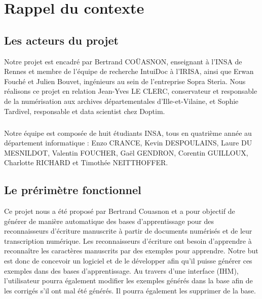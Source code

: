 
\chapter{Rappel du contexte}

\section{Les acteurs du projet}

Notre projet est encadré par Bertrand COÜASNON, enseignant à l’INSA de Rennes et membre de l’équipe de recherche IntuiDoc à l’IRISA, ainsi que Erwan Fouché et Julien Bouvet, ingénieurs au sein de l’entreprise Sopra Steria. Nous réalisons ce projet en relation Jean-Yves LE CLERC, conservateur et responsable de la numérisation  aux archives départementales d’Ille-et-Vilaine, et Sophie Tardivel, responsable et data scientist chez Doptim.

\paragraph{}

Notre équipe est composée de huit étudiants INSA, tous en quatrième année au département informatique : Enzo CRANCE, Kevin DESPOULAINS, Laure DU MESNILDOT, Valentin FOUCHER, Gaël GENDRON, Corentin GUILLOUX, Charlotte RICHARD et Timothée NEITTHOFFER.

\section{Le prérimètre fonctionnel}

Ce projet nous a été proposé par Bertrand Couasnon et a pour objectif de générer de manière automatique des bases d’apprentissage pour des reconnaisseurs d’écriture manuscrite à partir de documents numérisés et de leur transcription numérique. Les reconnaisseurs d’écriture ont besoin d’apprendre à reconnaître les caractères manuscrits par des exemples pour apprendre. Notre but est donc de concevoir un logiciel et de le développer afin qu’il puisse générer ces exemples dans des bases d’apprentissage. Au travers d’une interface (IHM), l’utilisateur pourra également modifier les exemples générés dans la base afin de les corrigés s’il ont mal été générés. Il pourra également les supprimer de la base.

\paragraph{}

